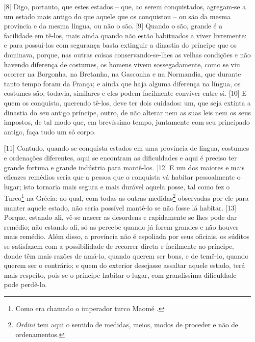 {[}8{]} Digo, portanto, que estes estados -- que, ao serem conquistados,
agregam-se a um estado mais antigo do que aquele que os conquistou -- ou
são da mesma província e da mesma língua, ou não o são. {[}9{]} Quando o
são, grande é a facilidade em tê-los, mais ainda quando não estão
habituados a viver livremente: e para possuí-los com segurança basta
extinguir a dinastia do príncipe que os dominava, porque, nas outras
coisas conservando-se-lhes as velhas condições e não havendo diferença
de costumes, os homens vivem sossegadamente, como se viu ocorrer na
Borgonha, na Bretanha, na Gasconha e na Normandia, que durante tanto
tempo foram da França; e ainda que haja alguma diferença na língua, os
costumes são, todavia, similares e eles podem facilmente conviver entre
si. {[}10{]} E quem os conquista, querendo tê-los, deve ter dois
cuidados: um, que seja extinta a dinastia do seu antigo príncipe, outro,
de não alterar nem as suas leis nem os seus impostos, de tal modo que, em brevíssimo tempo,
juntamente com seu principado antigo, faça tudo um só corpo.

{[}11{]} Contudo, quando se conquista estados em uma província de
língua, costumes e ordenações diferentes, aqui se encontram as
dificuldades e aqui é preciso ter grande fortuna e grande indústria para
mantê-los. {[}12{]} E um dos maiores e mais eficazes remédios seria que
a pessoa que o conquista vá habitar pessoalmente o lugar; isto tornaria
mais segura e mais durável aquela posse, tal como fez o Turco\footnote{Como
  era chamado o imperador turco Maomé .} na Grécia: ao qual, com todas
as outras medidas\footnote{\emph{Ordini} tem aqui o sentido de medidas,
  meios, modos de proceder e não de ordenamentos.} observadas por ele
para manter aquele estado, não seria possível mantê-lo se não fosse lá
habitar. {[}13{]} Porque, estando ali, vê-se nascer as desordens e
rapidamente se lhes pode dar remédio; não estando ali, só as percebe
quando já forem grandes e não houver mais remédio. Além disso, a
província não é espoliada por seus oficiais, os súditos se satisfazem
com a possibilidade de recorrer direta e facilmente ao príncipe, donde
têm mais razões de amá-lo, quando querem ser bons, e de temê-lo, quando
querem ser o contrário; e quem do exterior desejasse assaltar aquele
estado, terá mais respeito, pois se o príncipe habitar o lugar, com
grandíssima dificuldade pode perdê-lo.

